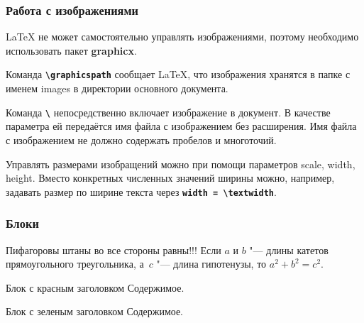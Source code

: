 \documentclass[aspectratio=169]{beamer}
\begin{document}
\begin{frame}
\frametitle{Работа с изображениями}
\LaTeX{} не может самостоятельно управлять изображениями, поэтому необходимо использовать пакет \textbf{graphicx}.

Команда \texttt{\textbf{\textbackslash graphicspath}} сообщает \LaTeX{}, что изображения хранятся в папке с именем images в директории основного документа.

Команда \texttt{\textbf{\textbackslash}} непосредственно включает изображение в документ.
В качестве параметра ей передаётся имя файла с изображением без расширения.
Имя файла с изображением не должно содержать пробелов и многоточий.

Управлять размерами изобращений можно при помощи параметров scale, width, height.
Вместо конкретных численных значений ширины можно, например, задавать размер по ширине текста через \texttt{\textbf{width = \textbackslash textwidth}}.
\end{frame}

\begin{frame}
\frametitle{Блоки}
	\begin{theorem}[Пифагора]
		Пифагоровы штаны во все стороны равны!!!
		Если $a$ и $b$ "--- длины катетов прямоугольного треугольника, а~$c$ "--- длина гипотенузы, то $a^2+b^2=c^2$.
	\end{theorem}

	\begin{alertblock}{Блок с красным заголовком}
		Содержимое.
	\end{alertblock}

	\begin{exampleblock}{Блок с зеленым заголовком}
		Содержимое.
	\end{exampleblock}
\end{frame}
\end{document}
